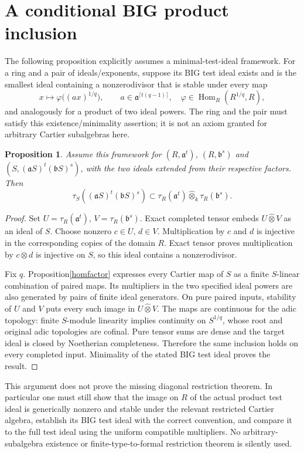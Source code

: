 \documentclass[11pt]{article}
\newtheorem{proposition}[theorem]{Proposition}
\newcommand{\Hom}{\operatorname{Hom}}
\newcommand{\wtensor}{\mathbin{\widehat\otimes}}
\begin{document}
\section{A conditional BIG product inclusion}
The following proposition explicitly assumes a minimal-test-ideal
framework. For a ring and a pair of ideals/exponents, suppose its BIG
test ideal exists and is the smallest ideal containing a nonzerodivisor
that is stable under every map
\[
 x\longmapsto\varphi\bigl((a x)^{1/q}\bigr),\qquad
 a\in\mathfrak a^{\lceil t(q-1)\rceil},
 \quad\varphi\in\Hom_R(R^{1/q},R),
\]
and analogously for a product of two ideal powers.
The ring and the pair must satisfy this existence/minimality assertion;
it is not an axiom granted for arbitrary Cartier subalgebras here.
\begin{proposition}\label{product}
Assume this framework for $(R,\mathfrak a^t)$,
$(R,\mathfrak b^s)$ and
$(S,(\mathfrak aS)^t(\mathfrak bS)^s)$, with the two ideals extended
from their respective factors. Then
\[
 \tau_S((\mathfrak aS)^t(\mathfrak bS)^s)
 \subset
 \tau_R(\mathfrak a^t)\wtensor_k\tau_R(\mathfrak b^s).
\]
\end{proposition}
\begin{proof}
Set $U=\tau_R(\mathfrak a^t)$, $V=\tau_R(\mathfrak b^s)$.
Exact completed tensor embeds $U\wtensor V$ as an ideal of $S$.
Choose nonzero $c\in U$, $d\in V$. Multiplication by $c$ and $d$ is
injective in the corresponding copies of the domain $R$. Exact tensor
proves multiplication by $c\otimes d$ is injective on $S$, so this ideal
contains a nonzerodivisor.

Fix $q$. Proposition\ref{homfactor} expresses every Cartier map of $S$
as a finite $S$-linear combination of paired maps. Its multipliers in the
two specified ideal powers are also generated by pairs of finite ideal
generators. On pure paired inputs, stability of $U$ and $V$ puts every
such image in $U\wtensor V$. The maps are continuous for the adic
topology: finite $S$-module linearity implies continuity on $S^{1/q}$,
whose root and original adic topologies are cofinal. Pure tensor sums
are dense and the target ideal is closed by Noetherian completeness.
Therefore the same inclusion holds on every completed input.
Minimality of the stated BIG test ideal proves the result.
\end{proof}
This argument does not prove the missing diagonal restriction theorem.
In particular one must still show that the image on $R$ of the actual
product test ideal is generically nonzero and stable under the relevant
restricted Cartier algebra, establish its BIG test ideal with the
correct convention, and compare it to the full test ideal using the
uniform compatible multipliers. No arbitrary-subalgebra existence or
finite-type-to-formal restriction theorem is silently used.
\end{document}
